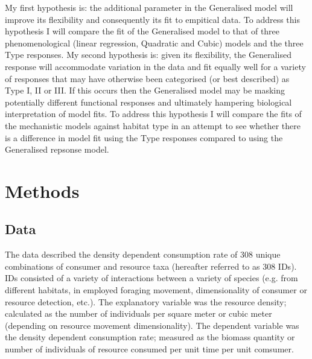 \documentclass[11pt]{article}
\begin{document}

        My first hypothesis is: the additional parameter in the Generalised model will improve its flexibility and consequently its fit to empitical data. To address this hypothesis I will compare the fit of the Generalised model to that of three phenomenological (linear regression, Quadratic and Cubic) models and the three Type responses. My second hypothesis is: given its flexibility, the Generalised response will accommodate variation in the data and fit equally well for a variety of responses that may have otherwise been categorised (or best described) as Type I, II or III. If this occurs then the Generalised model may be masking potentially different functional responses and ultimately hampering biological interpretation of model fits. To address this hypothesis I will compare the fits of the mechanistic models against habitat type in an attempt to see whether there is a difference in model fit using the Type responses compared to using the Generalised repsonse model.
            
    \section{Methods} %
        \subsection{Data}
            The data described the density dependent consumption rate of 308 unique combinations of consumer and resource taxa (hereafter referred to as 308 IDs). IDs consisted of a variety of interactions between a variety of species (e.g. from different habitats, in employed foraging movement, dimensionality of consumer or resource detection, etc.). The explanatory variable was the resource density; calculated as the number of individuals per square meter or cubic meter (depending on resource movement dimensionality). The dependent variable was the density dependent consumption rate; measured as the biomass quantity or number of individuals of resource consumed per unit time per unit comsumer. 
\end{document}
